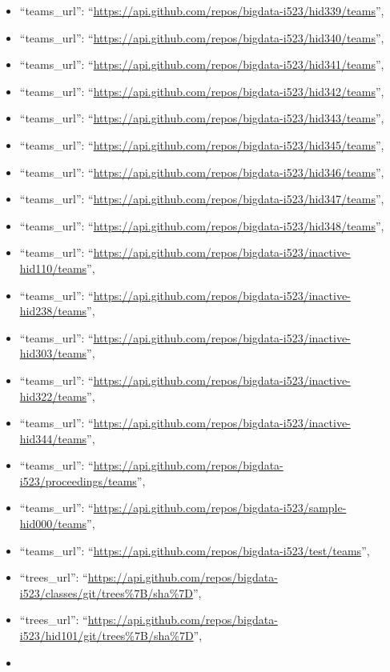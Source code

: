 \begin{itemize}
\item
  ``teams\_url'':
  ``\url{https://api.github.com/repos/bigdata-i523/hid339/teams}'',
\item
  ``teams\_url'':
  ``\url{https://api.github.com/repos/bigdata-i523/hid340/teams}'',
\item
  ``teams\_url'':
  ``\url{https://api.github.com/repos/bigdata-i523/hid341/teams}'',
\item
  ``teams\_url'':
  ``\url{https://api.github.com/repos/bigdata-i523/hid342/teams}'',
\item
  ``teams\_url'':
  ``\url{https://api.github.com/repos/bigdata-i523/hid343/teams}'',
\item
  ``teams\_url'':
  ``\url{https://api.github.com/repos/bigdata-i523/hid345/teams}'',
\item
  ``teams\_url'':
  ``\url{https://api.github.com/repos/bigdata-i523/hid346/teams}'',
\item
  ``teams\_url'':
  ``\url{https://api.github.com/repos/bigdata-i523/hid347/teams}'',
\item
  ``teams\_url'':
  ``\url{https://api.github.com/repos/bigdata-i523/hid348/teams}'',
\item
  ``teams\_url'':
  ``\url{https://api.github.com/repos/bigdata-i523/inactive-hid110/teams}'',
\item
  ``teams\_url'':
  ``\url{https://api.github.com/repos/bigdata-i523/inactive-hid238/teams}'',
\item
  ``teams\_url'':
  ``\url{https://api.github.com/repos/bigdata-i523/inactive-hid303/teams}'',
\item
  ``teams\_url'':
  ``\url{https://api.github.com/repos/bigdata-i523/inactive-hid322/teams}'',
\item
  ``teams\_url'':
  ``\url{https://api.github.com/repos/bigdata-i523/inactive-hid344/teams}'',
\item
  ``teams\_url'':
  ``\url{https://api.github.com/repos/bigdata-i523/proceedings/teams}'',
\item
  ``teams\_url'':
  ``\url{https://api.github.com/repos/bigdata-i523/sample-hid000/teams}'',
\item
  ``teams\_url'':
  ``\url{https://api.github.com/repos/bigdata-i523/test/teams}'',
\item
  ``trees\_url'':
  ``\url{https://api.github.com/repos/bigdata-i523/classes/git/trees\%7B/sha\%7D}'',
\item
  ``trees\_url'':
  ``\url{https://api.github.com/repos/bigdata-i523/hid101/git/trees\%7B/sha\%7D}'',
\item

\end{itemize}
